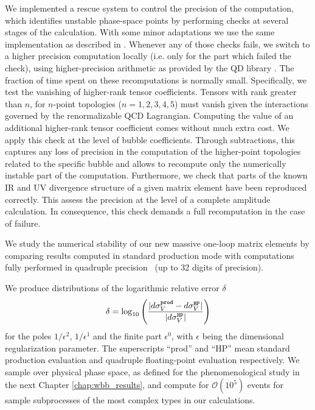 We implemented a rescue system to control the precision of the computation, which identifies unstable
phase-space points by performing checks at several
stages of the calculation. With some minor adaptations we use the same
implementation as described in \cite{Berger:2008sj,BH:W3jDistributions}. Whenever
any of those checks fails, we switch to a higher precision computation locally
(i.e. only for the part which failed the check), using
higher-precision arithmetic as provided by the QD library \cite{QD}. The fraction of time
spent on these recomputations is normally small. Specifically, we test the vanishing of higher-rank tensor
coefficients. Tensors with rank greater than $n$, for $n$-point topologies ($n=1,2,3,4,5$) must vanish given the interactions
governed by the renormalizable QCD Lagrangian. Computing the value of an
additional higher-rank tensor coefficient comes without much extra
cost. We apply this check at the level of bubble coefficients. Through
subtractions, this captures any loss of precision in the computation
of the higher-point topologies related to the specific bubble and
allows to recompute only the numerically instable part of the
computation. Furthermore, we check
that parts of the known IR and UV divergence structure
\cite{Catani:2000ef} of a given matrix element have been reproduced correctly.
This assess the precision at the level of a
complete amplitude calculation. In consequence, this check demands a full recomputation in the case of failure.


We study the numerical stability of our new massive
one-loop matrix elements by comparing results computed in standard
production mode with computations fully performed in
quadruple precision~\cite{QD} (up to 32 digits of precision).




We produce distributions of the logarithmic relative error $\delta$
\begin{align}
  \delta = \log_{10}\left(\frac{|d\sigma_{V}^{\text{\texttt{prod}}} -
      d\sigma_{V}^{\text{\texttt{HP}}}|}{|d\sigma_{V}^{\text{\texttt{HP}}}|}  \right)
\end{align}
for the poles $1/\epsilon^2$, $1/\epsilon^1$ and the finite part
$\epsilon^0$, with $\epsilon$ being the dimensional regularization
parameter. The superscripts ``prod'' and ``HP'' mean standard production evaluation and
quadruple floating-point evaluation respectively. We sample over physical
phase space, as defined for the phenomenological study in the next
Chapter \ref{chap:wbb_results}, and compute for $\mathcal{O}(10^5)$
events for sample subprocesses of the most complex types in our calculations. 


